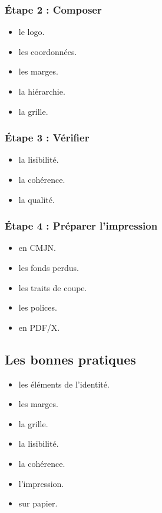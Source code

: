 \subsubsection{Étape 2 : Composer}

\begin{itemize}
    \item {} le logo.
    \item {} les coordonnées.
    \item {} les marges.
    \item {} la hiérarchie.
    \item {} la grille.
\end{itemize}

\subsubsection{Étape 3 : Vérifier}

\begin{itemize}
    \item {} la lisibilité.
    \item {} la cohérence.
    \item {} la qualité.
\end{itemize}

\subsubsection{Étape 4 : Préparer l'impression}

\begin{itemize}
    \item {} en CMJN.
    \item {} les fonds perdus.
    \item {} les traits de coupe.
    \item {} les polices.
    \item {} en PDF/X.
\end{itemize}

\subsection{Les bonnes pratiques}

\begin{itemize}
    \item {} les éléments de l'identité.
    \item {} les marges.
    \item {} la grille.
    \item {} la lisibilité.
    \item {} la cohérence.
    \item {} l'impression.
    \item {} sur papier.
\end{itemize}

